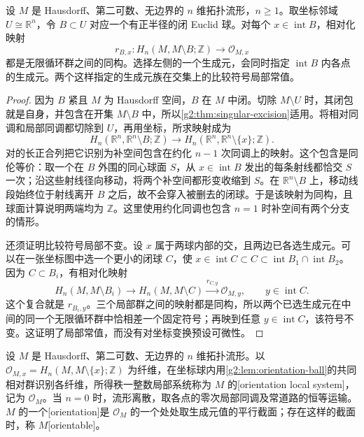 \begin{lemma}\label{g2:lem:orientation-ball}
	设 \(M\) 是 Hausdorff、第二可数、无边界的 \(n\) 维拓扑流形，\(n\geq1\)。取坐标邻域 \(U\cong\mathbb R^n\)，令 \(B\subset U\) 对应一个有正半径的闭 Euclid 球。对每个 \(x\in\operatorname{int}B\)，相对化映射
	\[
		r_{B,x}:H_n(M,M\setminus B;\mathbb Z)\longrightarrow\mathcal O_{M,x}
	\]
	都是无限循环群之间的同构。选择左侧的一个生成元，会同时指定 \(\operatorname{int}B\) 内各点的生成元。两个这样指定的生成元族在交集上的比较符号局部常值。
\end{lemma}
\begin{proof}
	因为 \(B\) 紧且 \(M\) 为 Hausdorff 空间，\(B\) 在 \(M\) 中闭。切除 \(M\setminus U\) 时，其闭包就是自身，并包含在开集 \(M\setminus B\) 中，所以\cref{g2:thm:singular-excision}适用。将相对同调和局部同调都切除到 \(U\)，再用坐标，所求映射成为
	\[
		H_n(\mathbb R^n,\mathbb R^n\setminus B;\mathbb Z)
		\longrightarrow H_n(\mathbb R^n,\mathbb R^n\setminus\{x\};\mathbb Z).
	\]
	对的长正合列把它识别为补空间包含在约化 \(n-1\) 次同调上的映射。这个包含是同伦等价：取一个在 \(B\) 外围的同心球面 \(S\)，从 \(x\in\operatorname{int}B\) 发出的每条射线都恰交 \(S\) 一次；沿这些射线径向移动，将两个补空间都形变收缩到 \(S\)。在 \(\mathbb R^n\setminus B\) 上，移动线段始终位于射线离开 \(B\) 之后，故不会穿入被删去的闭球。于是该映射为同构，且球面计算说明两端均为 \(\mathbb Z\)。这里使用约化同调也包含 \(n=1\) 时补空间有两个分支的情形。

	还须证明比较符号局部不变。设 \(x\) 属于两球内部的交，且两边已各选生成元。可以在一张坐标图中选一个更小的闭球 \(C\)，使 \(x\in\operatorname{int}C\subset C\subset\operatorname{int}B_1\cap\operatorname{int}B_2\)。因为 \(C\subset B_i\)，有相对化映射
	\[
		H_n(M,M\setminus B_i)\longrightarrow H_n(M,M\setminus C)
		\xrightarrow{r_{C,y}}\mathcal O_{M,y},\qquad y\in\operatorname{int}C.
	\]
	这个复合就是 \(r_{B_i,y}\)。三个局部群之间的映射都是同构，所以两个已选生成元在中间的同一个无限循环群中恰相差一个固定符号；再映到任意 \(y\in\operatorname{int}C\)，该符号不变。这证明了局部常值，而没有对坐标变换预设可微性。
\end{proof}

\begin{definition}[定向局部系统]\label{g2:def:orientation-local-system}
	设 \(M\) 是 Hausdorff、第二可数、无边界的 \(n\) 维拓扑流形。以 \(\mathcal O_{M,x}=H_n(M,M\setminus\{x\};\mathbb Z)\) 为纤维，在坐标球内用\cref{g2:lem:orientation-ball}的共同相对群识别各纤维，所得秩一整数局部系统称为 \(M\) 的[orientation local system]，记为 \(\mathcal O_M\)。当 \(n=0\) 时，流形离散，取各点的零次局部同调及常道路的恒等运输。\(M\) 的一个[orientation]是 \(\mathcal O_M\) 的一个处处取生成元值的平行截面；存在这样的截面时，称 \(M\)[orientable]。
\end{definition}

